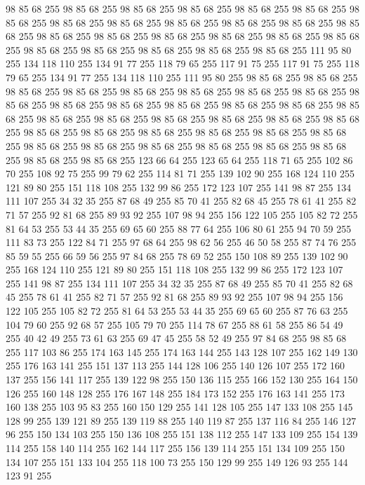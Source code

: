 98 85 68 255 98 85 68 255 98 85 68 255 98 85 68 255 98 85 68 255 98 85 68 255 98 85 68 255 98 85 68 255 98 85 68 255 98 85 68 255 98 85 68 255 98 85 68 255 98 85 68 255 98 85 68 255 98 85 68 255 98 85 68 255 98 85 68 255 98 85 68 255 98 85 68 255 98 85 68 255 98 85 68 255 98 85 68 255 98 85 68 255 98 85 68 255 111 95 80 255 134 118 110 255 134 91 77 255 118 79 65 255 117 91 75 255 117 91 75 255 118 79 65 255 134 91 77 255 134 118 110 255 111 95 80 255 98 85 68 255 98 85 68 255 98 85 68 255 98 85 68 255 98 85 68 255 98 85 68 255 98 85 68 255 98 85 68 255 98 85 68 255 98 85 68 255 98 85 68 255 98 85 68 255 98 85 68 255 98 85 68 255 98 85 68 255 98 85 68 255 98 85 68 255 98 85 68 255 98 85 68 255 98 85 68 255 98 85 68 255 98 85 68 255 98 85 68 255 98 85 68 255 98 85 68 255 98 85 68 255 98 85 68 255 98 85 68 255 98 85 68 255 98 85 68 255
98 85 68 255 98 85 68 255 98 85 68 255 98 85 68 255 98 85 68 255 123 66 64 255 123 65 64 255 118 71 65 255 102 86 70 255 108 92 75 255 99 79 62 255 114 81 71 255 139 102 90 255 168 124 110 255 121 89 80 255 151 118 108 255 132 99 86 255 172 123 107 255 141 98 87 255 134 111 107 255 34 32 35 255 87 68 49 255 85 70 41 255 82 68 45 255 78 61 41 255 82 71 57 255 92 81 68 255 89 93 92 255 107 98 94 255 156 122 105 255 105 82 72 255 81 64 53 255 53 44 35 255 69 65 60 255 88 77 64 255 106 80 61 255 94 70 59 255 111 83 73 255 122 84 71 255 97 68 64 255 98 62 56 255 46 50 58 255 87 74 76 255 85 59 55 255 66 59 56 255 97 84 68 255 78 69 52 255 150 108 89 255 139 102 90 255 168 124 110 255 121 89 80 255 151 118 108 255 132 99 86 255 172 123 107 255 141 98 87 255 134 111 107 255 34 32 35 255 87 68 49 255 85 70 41 255 82 68 45 255 78 61 41 255 82 71 57 255 92 81 68 255 89 93 92 255
107 98 94 255 156 122 105 255 105 82 72 255 81 64 53 255 53 44 35 255 69 65 60 255 87 76 63 255 104 79 60 255 92 68 57 255 105 79 70 255 114 78 67 255 88 61 58 255 86 54 49 255 40 42 49 255 73 61 63 255 69 47 45 255 58 52 49 255 97 84 68 255 98 85 68 255 117 103 86 255 174 163 145 255 174 163 144 255 143 128 107 255 162 149 130 255 176 163 141 255 151 137 113 255 144 128 106 255 140 126 107 255 172 160 137 255 156 141 117 255 139 122 98 255 150 136 115 255 166 152 130 255 164 150 126 255 160 148 128 255 176 167 148 255 184 173 152 255 176 163 141 255 173 160 138 255 103 95 83 255 160 150 129 255 141 128 105 255 147 133 108 255 145 128 99 255 139 121 89 255 139 119 88 255 140 119 87 255 137 116 84 255 146 127 96 255 150 134 103 255 150 136 108 255 151 138 112 255 147 133 109 255 154 139 114 255 158 140 114 255 162 144 117 255 156 139 114 255 151 134 109 255 150 134 107 255 151 133 104 255 118 100 73 255 150 129 99 255 149 126 93 255 144 123 91 255
